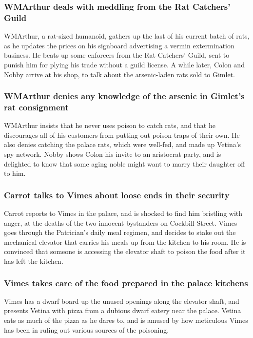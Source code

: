 \subsubsection{\Gls{WMArthur} deals with meddling from the Rat Catchers' Guild}
\Gls{WMArthur}, a rat-sized humanoid, gathers up the last of his current batch of rats, as he
updates the prices on his signboard advertising a vermin extermination business. He beats up some
enforcers from the Rat Catchers' Guild, sent to punish him for plying his trade without a guild
license. A while later, \Gls{Colon} and \Gls{Nobby} arrive at his shop, to talk about the
arsenic-laden rats sold to \Gls{Gimlet}.

\subsubsection{\Gls{WMArthur} denies any knowledge of the arsenic in \Gls{Gimlet}'s rat consignment}
\Gls{WMArthur} insists that he never uses poison to catch rats, and that he discourages all of his
customers from putting out poison-traps of their own. He also denies catching the palace rats, which
were well-fed, and made up \Gls{Vetina}'s spy network. \Gls{Nobby} shows \Gls{Colon} his invite to
an aristocrat party, and is delighted to know that some aging noble might want to marry their
daughter off to him.

\subsubsection{\Gls{Carrot} talks to \Gls{Vimes} about loose ends in their security}
\Gls{Carrot} reports to \Gls{Vimes} in the palace, and is shocked to find him bristling with anger,
at the deaths of the two innocent bystanders on Cockbill Street. \Gls{Vimes} goes through the
Patrician's daily meal regimen, and decides to stake out the mechanical elevator that carries his
meals up from the kitchen to his room. He is convinced that someone is accessing the elevator shaft
to poison the food after it has left the kitchen.

\subsubsection{\Gls{Vimes} takes care of the food prepared in the palace kitchens}
\Gls{Vimes} has a dwarf board up the unused openings along the elevator shaft, and presents
\Gls{Vetina} with pizza from a dubious dwarf eatery near the palace. \Gls{Vetina} eats as much of
the pizza as he dares to, and is amused by how meticulous \Gls{Vimes} has been in ruling out
various sources of the poisoning.

